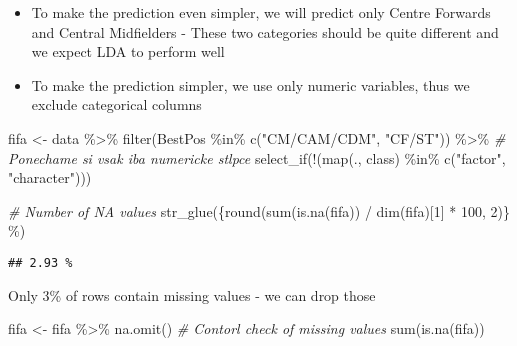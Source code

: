 \documentclass[
]{article}
\newenvironment{Shaded}{\begin{snugshade}}{\end{snugshade}}
\newcommand{\CommentTok}[1]{\textcolor[rgb]{0.56,0.35,0.01}{\textit{#1}}}
\newcommand{\FunctionTok}[1]{\textcolor[rgb]{0.00,0.00,0.00}{#1}}
\newcommand{\NormalTok}[1]{#1}
\newcommand{\OtherTok}[1]{\textcolor[rgb]{0.56,0.35,0.01}{#1}}
\newcommand{\SpecialCharTok}[1]{\textcolor[rgb]{0.00,0.00,0.00}{#1}}
\newcommand{\StringTok}[1]{\textcolor[rgb]{0.31,0.60,0.02}{#1}}
\providecommand{\tightlist}{%
  \setlength{\itemsep}{0pt}\setlength{\parskip}{0pt}}
\begin{document}
\begin{itemize}
\tightlist
\item
  To make the prediction even simpler, we will predict only Centre
  Forwards and Central Midfielders - These two categories should be
  quite different and we expect LDA to perform well
\item
  To make the prediction simpler, we use only numeric variables, thus we
  exclude categorical columns
\end{itemize}

\begin{Shaded}
\begin{Highlighting}[]
\NormalTok{fifa }\OtherTok{\textless{}{-}}\NormalTok{ data }\SpecialCharTok{\%\textgreater{}\%}
    \FunctionTok{filter}\NormalTok{(BestPos }\SpecialCharTok{\%in\%} \FunctionTok{c}\NormalTok{(}\StringTok{"CM/CAM/CDM"}\NormalTok{, }\StringTok{"CF/ST"}\NormalTok{)) }\SpecialCharTok{\%\textgreater{}\%}
    \CommentTok{\# Ponechame si vsak iba numericke stlpce}
    \FunctionTok{select\_if}\NormalTok{(}\SpecialCharTok{!}\NormalTok{(}\FunctionTok{map}\NormalTok{(., class) }\SpecialCharTok{\%in\%} \FunctionTok{c}\NormalTok{(}\StringTok{"factor"}\NormalTok{, }\StringTok{"character"}\NormalTok{)))}
\end{Highlighting}
\end{Shaded}

\begin{Shaded}
\begin{Highlighting}[]
\CommentTok{\# Number of NA values}
\FunctionTok{str\_glue}\NormalTok{(}\StringTok{\textquotesingle{}\{round(sum(is.na(fifa)) / dim(fifa)[1] * 100, 2)\} \%\textquotesingle{}}\NormalTok{)}
\end{Highlighting}
\end{Shaded}

\begin{verbatim}
## 2.93 %
\end{verbatim}

Only 3\% of rows contain missing values - we can drop those

\begin{Shaded}
\begin{Highlighting}[]
\NormalTok{fifa }\OtherTok{\textless{}{-}}\NormalTok{ fifa }\SpecialCharTok{\%\textgreater{}\%}
    \FunctionTok{na.omit}\NormalTok{()}
\CommentTok{\# Contorl check of missing values}
\FunctionTok{sum}\NormalTok{(}\FunctionTok{is.na}\NormalTok{(fifa))}
\end{Highlighting}
\end{Shaded}
\end{document}
